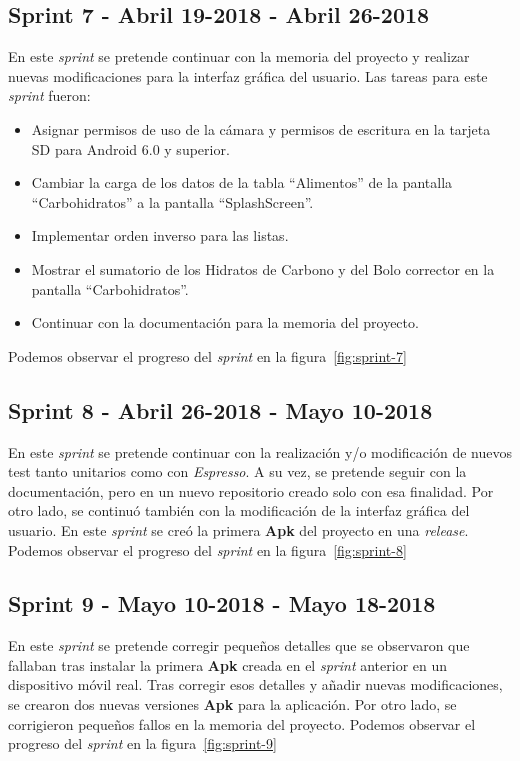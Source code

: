 \subsection{Sprint 7 - Abril 19-2018 - Abril 26-2018}
En este \textit{sprint} se pretende continuar con la memoria del proyecto y realizar nuevas modificaciones para la interfaz gráfica del usuario. Las tareas para este \textit{sprint} fueron:
\begin{itemize}
	\item Asignar permisos de uso de la cámara y permisos de escritura en la tarjeta SD para Android 6.0 y superior.
	\item Cambiar la carga de los datos de la tabla ``Alimentos'' de la pantalla ``Carbohidratos'' a la pantalla ``SplashScreen''.
	\item Implementar orden inverso para las listas.
	\item Mostrar el sumatorio de los Hidratos de Carbono y del Bolo corrector en la pantalla ``Carbohidratos''.
	\item Continuar con la documentación para la memoria del proyecto.
\end{itemize}
Podemos observar el progreso del \textit{sprint} en la figura~\ref{fig:sprint-7}
\subsection{Sprint 8 - Abril 26-2018 - Mayo 10-2018}
En este \textit{sprint} se pretende continuar con la realización y/o modificación de nuevos test tanto unitarios como con \textit{Espresso}. A su vez, se pretende seguir con la documentación, pero en un nuevo repositorio creado solo con esa finalidad.
Por otro lado, se continuó también con la modificación de la interfaz gráfica del usuario.
En este \textit{sprint} se creó la primera \textbf{Apk} del proyecto en una \textit{release}.
Podemos observar el progreso del \textit{sprint} en la figura~\ref{fig:sprint-8}
\subsection{Sprint 9 - Mayo 10-2018 - Mayo 18-2018}
En este \textit{sprint} se pretende corregir pequeños detalles que se observaron que fallaban tras instalar la primera \textbf{Apk} creada en el \textit{sprint} anterior en un dispositivo móvil real.
Tras corregir esos detalles y añadir nuevas modificaciones, se crearon dos nuevas versiones \textbf{Apk} para la aplicación. 
Por otro lado, se corrigieron pequeños fallos en la memoria del proyecto.
Podemos observar el progreso del \textit{sprint} en la figura~\ref{fig:sprint-9}
